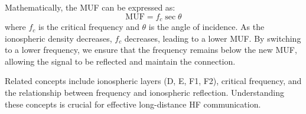 Mathematically, the MUF can be expressed as:
\[ \text{MUF} = f_c \sec \theta \]
where \( f_c \) is the critical frequency and \( \theta \) is the angle of incidence. As the ionospheric density decreases, \( f_c \) decreases, leading to a lower MUF. By switching to a lower frequency, we ensure that the frequency remains below the new MUF, allowing the signal to be reflected and maintain the connection.

Related concepts include ionospheric layers (D, E, F1, F2), critical frequency, and the relationship between frequency and ionospheric reflection. Understanding these concepts is crucial for effective long-distance HF communication.

